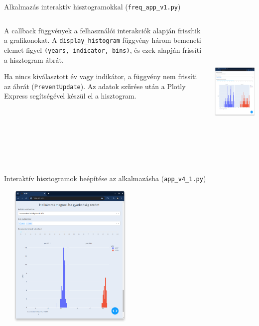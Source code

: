 \documentclass[english, aspectratio=169]{beamer}
\begin{document}
\begin{frame}{Alkalmazás interaktív hisztogramokkal (\texttt{freq\_app\_v1.py})}
	\begin{columns}
		\begin{column}{.5\textwidth}
			A callback függvények a felhasználói interakciók alapján frissítik a grafikonokat. A \texttt{display\_histogram} függvény három bemeneti elemet figyel \texttt{(years, indicator, bins)}, és ezek alapján frissíti a hisztogram ábrát.\par\medskip
			Ha nincs kiválasztott év vagy indikátor, a függvény nem frissíti az ábrát (\texttt{PreventUpdate}). Az adatok szűrése után a Plotly Express segítségével készül el a hisztogram.
		\end{column}
		\begin{column}{.5\textwidth}
			\begin{center}
				\includegraphics[width=7cm, height=7cm, keepaspectratio]{images/freq_9.png}
			\end{center}
		\end{column}
	\end{columns}
\end{frame}

\begin{frame}{Interaktív hisztogramok beépítése az alkalmazásba (\texttt{app\_v4\_1.py})}
	\begin{center}
		\includegraphics[width=7cm, height=7cm, keepaspectratio]{images/freq_10.png}
	\end{center}
\end{frame}
\end{document}
